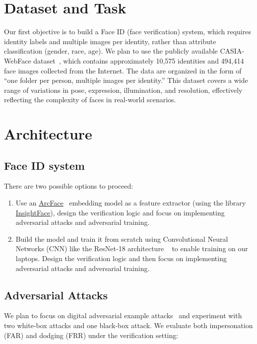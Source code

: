 \documentclass[cameraready]{Interspeech}
\begin{document}
\vspace{-3mm}
\section{Dataset and Task}
Our first objective is to build a Face ID (face verification) system, which requires identity labels and multiple images per identity, rather than attribute classification (gender, race, age). We plan to use the publicly available CASIA-WebFace dataset~\cite{CASIA}, which contains approximately 10,575 identities and 494,414 face images collected from the Internet. The data are organized in the form of “one folder per person, multiple images per identity.” This dataset covers a wide range of variations in pose, expression, illumination, and resolution, effectively reflecting the complexity of faces in real-world scenarios.





\vspace{-2mm}
\section{Architecture}

\subsection{Face ID system}
There are two possible options to proceed:
\begin{enumerate}[label=\Roman*)]
    \item  Use an \href{https://medium.com/@ichigo.v.gen12/arcface-architecture-and-practical-example-how-to-calculate-the-face-similarity-between-images-183896a35957#a5a8}{ArcFace}~\cite{ArcFace} embedding model as a feature extractor (using the library \href{https://pypi.org/project/insightface/}{InsightFace}), design the verification logic and focus on implementing adversarial attacks and adversarial training.
    \item  Build the model and train it from scratch using Convolutional Neural Networks (CNN) like the ResNet-18 architecture ~\cite{ResNet} to enable training on our laptops. Design the verification logic and then focus on implementing adversarial attacks and adversarial training.
\end{enumerate}

\vspace{-1mm}
\subsection{Adversarial Attacks}
We plan to focus on digital adversarial example attacks~\cite{GoodfellowAdversarial} and experiment with two white-box attacks and one black-box attack. We evaluate both impersonation (FAR) and dodging (FRR) under the verification setting:
\end{document}
